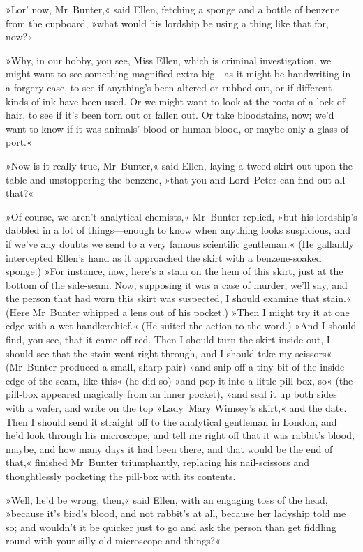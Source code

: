 »Lor' now, Mr~Bunter,« said Ellen, fetching a sponge and a bottle of benzene from the cupboard, »what would his lordship be using a thing like that for, now?«

»Why, in our hobby, you see, Miss Ellen, which is criminal investigation, we might want to see something magnified extra big—as it might be handwriting in a forgery case, to see if anything's been altered or rubbed out, or if different kinds of ink have been used. Or we might want to look at the roots of a lock of hair, to see if it's been torn out or fallen out. Or take bloodstains, now; we'd want to know if it was animals' blood or human blood, or maybe only a glass of port.«

»Now is it really true, Mr~Bunter,« said Ellen, laying a tweed skirt out upon the table and unstoppering the benzene, »that you and Lord~Peter can find out all that?«

»Of course, we aren't analytical chemists,« Mr~Bunter replied, »but his lordship's dabbled in a lot of things—enough to know when anything looks suspicious, and if we've any doubts we send to a very famous scientific gentleman.« (He gallantly intercepted Ellen's hand as it approached the skirt with a benzene-soaked sponge.) »For instance, now, here's a stain on the hem of this skirt, just at the bottom of the side-seam. Now, supposing it was a case of murder, we'll say, and the person that had worn this skirt was suspected, I should examine that stain.« (Here Mr~Bunter whipped a lens out of his pocket.) »Then I might try it at one edge with a wet handkerchief.« (He suited the action to the word.) »And I should find, you see, that it came off red.  Then I should turn the skirt inside-out, I should see that the stain went right through, and I should take my scissors« (Mr~Bunter produced a small, sharp pair) »and snip off a tiny bit of the inside edge of the seam, like this« (he did so) »and pop it into a little pill-box, so« (the pill-box appeared magically from an inner pocket), »and seal it up both sides with a wafer, and write on the top »Lady~Mary Wimsey's skirt,« and the date. Then I should send it straight off to the analytical gentleman in London, and he'd look through his microscope, and tell me right off that it was rabbit's blood, maybe, and how many days it had been there, and that would be the end of that,« finished Mr~Bunter triumphantly, replacing his nail-scissors and thoughtlessly pocketing the pill-box with its contents.

»Well, he'd be wrong, then,« said Ellen, with an engaging toss of the head, »because it's bird's blood, and not rabbit's at all, because her ladyship told me so; and wouldn't it be quicker just to go and ask the person than get fiddling round with your silly old microscope and things?«

